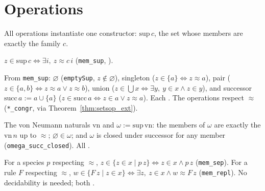 \section{Operations}
\label{sec:setsop_ops}

All operations instantiate one constructor: $\mathrm{sup}\,c$, the set whose
members are exactly the family $c$.

\begin{theorem}
\label{thm:setsop_sup}
\leanok
{}
$z \in \mathrm{sup}\,c \iff \exists i,\ z \approx c\,i$ (\texttt{mem\_sup},
\axiomprofile{[]}).
\end{theorem}

\begin{theorem}
\label{thm:setsop_basic}
\leanok
{}
From \texttt{mem\_sup}: $\varnothing$ (\texttt{emptySup}, $z\notin\varnothing$),
singleton ($z\in\{a\}\iff z\approx a$), pair
($z\in\{a,b\}\iff z\approx a\vee z\approx b$), union
($z\in\bigcup x\iff\exists y,\ y\in x\wedge z\in y$), and successor
$\mathrm{succ}\,a := a\cup\{a\}$ ($z\in\mathrm{succ}\,a\iff z\in a\vee z\approx a$).
Each \axiomprofile{[]}.  The operations respect
$\approx$ (\texttt{*\_congr}, via Theorem~\ref{thm:setsop_ext}).
\end{theorem}

\begin{theorem}[Infinity]
\label{thm:setsop_omega}
\leanok
{}
The von Neumann naturals $\mathrm{vn}$ and $\omega := \mathrm{sup}\,\mathrm{vn}$:
the members of $\omega$ are exactly the $\mathrm{vn}\,n$ up to $\approx$;
$\varnothing\in\omega$; and $\omega$ is closed under successor for any member
(\texttt{omega\_succ\_closed}).  All \axiomprofile{[]}.
\end{theorem}

\begin{theorem}
\label{thm:setsop_schemas}
\leanok
{}
For a species $p$ respecting $\approx$,
$z\in\{z\in x\mid p\,z\}\iff z\in x\wedge p\,z$ (\texttt{mem\_sep}).  For a rule
$F$ respecting $\approx$, $w\in\{F\,z\mid z\in x\}\iff\exists z,\ z\in x\wedge
w\approx F\,z$ (\texttt{mem\_repl}).  No decidability is needed; both
\axiomprofile{[]}.
\end{theorem}

